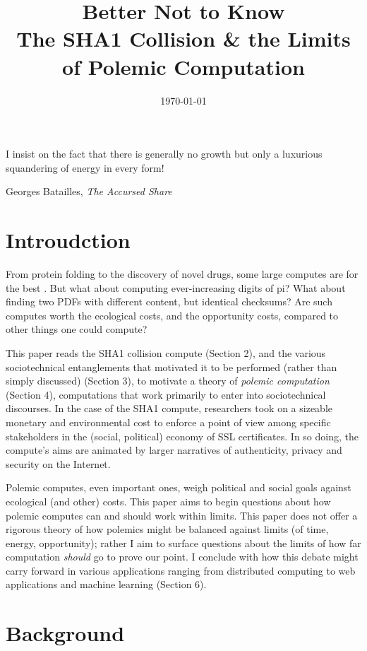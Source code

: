 \documentclass[sigconf]{acmart}
\date{\today}
\title{Better Not to Know\\\medskip
\large The SHA1 Collision \& the Limits of Polemic Computation}
\begin{document}
\maketitle

\epigraph{I insist on the fact that there is generally no growth but only a luxurious squandering of energy in every form!}{Georges Batailles, \textit{The Accursed Share}}

\section{Introudction}
\label{sec:org7fc4a20}

From protein folding to the discovery of novel drugs,
some large computes are for the best
\cite{Anderson2004}.
But what about computing ever-increasing digits of pi?
What about finding two PDFs with different content, but identical checksums?
Are such computes worth
the ecological costs, and the opportunity costs, compared to other things one could compute?

This paper reads the SHA1 collision compute (Section 2), and the various sociotechnical entanglements that motivated it to be performed (rather than simply discussed) (Section 3),
to motivate a theory of \emph{polemic computation} (Section 4), 
computations that
work primarily to enter into sociotechnical discourses.
In the case of the SHA1 compute, researchers took on a sizeable monetary and environmental cost
to enforce a point of view among specific stakeholders in the (social, political) economy of SSL certificates.
In so doing, the compute's aims are animated by
larger narratives of authenticity, privacy and security on the Internet.

Polemic computes, even important ones, weigh political and social goals against ecological (and other) costs.
This paper aims to begin questions about how polemic computes can and should work within limits.
This paper does not offer a rigorous theory of how polemics might be balanced against limits (of time, energy, opportunity);
rather I aim to surface questions about the limits of how far computation \emph{should} go to prove our point.
I conclude with how this debate might carry forward in various applications ranging from distributed computing to web applications and machine learning (Section 6).


\section{Background}
\label{sec:org3ff9814}
\end{document}
